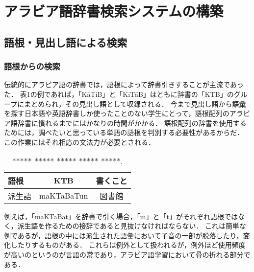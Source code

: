 \documentclass[technicalreport]{ieicej}
\begin{document}
\section{アラビア語辞書検索システムの構築}
\subsection{語根・見出し語による検索}
\subsubsection{語根からの検索}
伝統的にアラビア語の辞書では，語根によって辞書引きすることが主流であった．
表1の例であれば，「KāTiB」と「KiTāB」はともに辞書の「KTB」のグループにまとめられ，その見出し語として収録される．
今まで見出し語から語彙を探す日本語や英語辞書しか使ったことのない学生にとって，語根配列のアラビア語辞書に慣れるまでにはかなりの時間がかかる．
語根配列の辞書を使用するためには，調べたいと思っている単語の語根を判別する必要性があるからだ．
この作業にはそれ相応の文法力が必要とされる．

\begin{table}[ht]
\begin{center}
\begin{tabular}{l|cc}
   語根& KTB & 書くこと\\
  \hline
 派生語& maKTaBaTun & 図書館\\
\hline
\end{tabular}
\caption{***** ***** ***** ***** *****.}
\label{table:alignment}
\end{center}
\end{table}
例えば，「maKTaBat」を辞書で引く場合，「m」と「t」がそれぞれ語根ではなく，派生語を作るための接辞であると見抜けなければならない．
これは簡単な例であるが，語根の中には派生された語彙において子音の一部が脱落したり，変化したりするものがある．
これらは例外として扱われるが，例外ほど使用頻度が高いのというのが言語の常であり，アラビア語学習において骨の折れる部分である．
\end{document}
